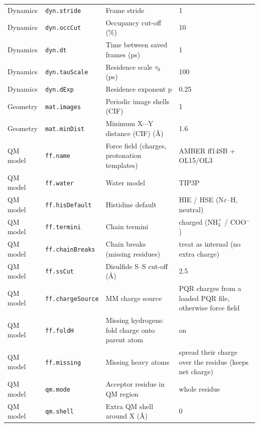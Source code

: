 {\begin{longtable}{llp{4.2cm}l}
Dynamics & \texttt{dyn.stride} & Frame stride & \parbox[t]{5.0cm}{\raggedright 1}\\
Dynamics & \texttt{dyn.occCut} & Occupancy cut-off (\%) & \parbox[t]{5.0cm}{\raggedright 10}\\
Dynamics & \texttt{dyn.dt} & Time between saved frames (ps) & \parbox[t]{5.0cm}{\raggedright 1}\\
Dynamics & \texttt{dyn.tauScale} & Residence scale $\tau_0$ (ps) & \parbox[t]{5.0cm}{\raggedright 100}\\
Dynamics & \texttt{dyn.dExp} & Residence exponent p & \parbox[t]{5.0cm}{\raggedright 0.25}\\
Geometry & \texttt{mat.images} & Periodic image shells (CIF) & \parbox[t]{5.0cm}{\raggedright 1}\\
Geometry & \texttt{mat.minDist} & Minimum X$\cdots$Y distance (CIF) (\AA{}) & \parbox[t]{5.0cm}{\raggedright 1.6}\\
QM model & \texttt{ff.name} & Force field (charges, protonation templates) & \parbox[t]{5.0cm}{\raggedright AMBER ff14SB + OL15/OL3}\\
QM model & \texttt{ff.water} & Water model & \parbox[t]{5.0cm}{\raggedright TIP3P}\\
QM model & \texttt{ff.hisDefault} & Histidine default & \parbox[t]{5.0cm}{\raggedright HIE / HSE (N$\varepsilon$--H, neutral)}\\
QM model & \texttt{ff.termini} & Chain termini & \parbox[t]{5.0cm}{\raggedright charged (NH$_3^+$ / COO$^-$)}\\
QM model & \texttt{ff.chainBreaks} & Chain breaks (missing residues) & \parbox[t]{5.0cm}{\raggedright treat as internal (no extra charge)}\\
QM model & \texttt{ff.ssCut} & Disulfide S--S cut-off (\AA{}) & \parbox[t]{5.0cm}{\raggedright 2.5}\\
QM model & \texttt{ff.chargeSource} & MM charge source & \parbox[t]{5.0cm}{\raggedright PQR charges from a loaded PQR file, otherwise force field}\\
QM model & \texttt{ff.foldH} & Missing hydrogens: fold charge onto parent atom & \parbox[t]{5.0cm}{\raggedright on}\\
QM model & \texttt{ff.missing} & Missing heavy atoms & \parbox[t]{5.0cm}{\raggedright spread their charge over the residue (keeps net charge)}\\
QM model & \texttt{qm.mode} & Acceptor residue in QM region & \parbox[t]{5.0cm}{\raggedright whole residue}\\
QM model & \texttt{qm.shell} & Extra QM shell around X (\AA{}) & \parbox[t]{5.0cm}{\raggedright 0}\\

\end{longtable}}
